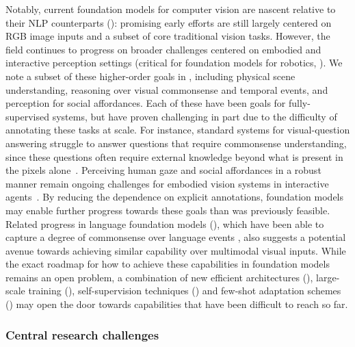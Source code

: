 Notably, current foundation models for computer vision are nascent relative to their NLP counterparts (): promising early efforts are still largely centered on RGB image inputs and a subset of core traditional vision tasks. However, the field continues to progress on broader challenges centered on embodied and interactive perception settings (critical for foundation models for robotics, ). We note a subset of these higher-order goals in , including physical scene understanding, reasoning over visual commonsense and temporal events, and perception for social affordances.
Each of these have been goals for fully-supervised systems, but have proven challenging in part due to the difficulty of annotating these tasks at scale. 
For instance, standard systems for visual-question answering struggle to answer questions that require commonsense understanding, since these questions often require external knowledge beyond what is present in the pixels alone~\cite{zellers2019vcr}. Perceiving human gaze and social affordances in a robust manner remain ongoing challenges for embodied vision systems in interactive agents~\cite{martin2021jrdb}. By reducing the dependence on explicit annotations, foundation models may enable further progress towards these goals than was previously feasible. Related progress in language foundation models (), which have been able to capture a degree of commonsense over language events \cite{brown2020gpt3}, also suggests a potential avenue towards achieving similar capability over multimodal visual inputs. While the exact roadmap for how to achieve these capabilities in foundation models remains an open problem, a combination of new efficient architectures (), large-scale training (), self-supervision techniques () and few-shot adaptation schemes () may open the door towards capabilities that have been difficult to reach so far.

\subsubsection{Central research challenges}
\label{sec:vision-challenges}

